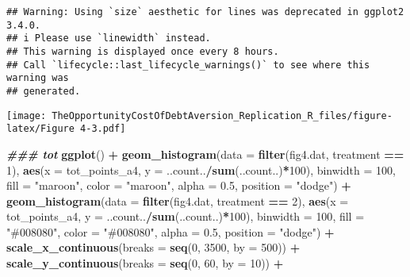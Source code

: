\documentclass[
]{article}
\newenvironment{Shaded}{\begin{snugshade}}{\end{snugshade}}
\newcommand{\AttributeTok}[1]{\textcolor[rgb]{0.13,0.29,0.53}{#1}}
\newcommand{\DecValTok}[1]{\textcolor[rgb]{0.00,0.00,0.81}{#1}}
\newcommand{\DocumentationTok}[1]{\textcolor[rgb]{0.56,0.35,0.01}{\textbf{\textit{#1}}}}
\newcommand{\FloatTok}[1]{\textcolor[rgb]{0.00,0.00,0.81}{#1}}
\newcommand{\FunctionTok}[1]{\textcolor[rgb]{0.13,0.29,0.53}{\textbf{#1}}}
\newcommand{\NormalTok}[1]{#1}
\newcommand{\SpecialCharTok}[1]{\textcolor[rgb]{0.81,0.36,0.00}{\textbf{#1}}}
\newcommand{\StringTok}[1]{\textcolor[rgb]{0.31,0.60,0.02}{#1}}
\begin{document}
\begin{verbatim}
## Warning: Using `size` aesthetic for lines was deprecated in ggplot2 3.4.0.
## i Please use `linewidth` instead.
## This warning is displayed once every 8 hours.
## Call `lifecycle::last_lifecycle_warnings()` to see where this warning was
## generated.
\end{verbatim}

\texttt{[image: TheOpportunityCostOfDebtAversion\_Replication\_R\_files/figure-latex/Figure 4-3.pdf]}

\begin{Shaded}
\begin{Highlighting}[]
\DocumentationTok{\#\#\# tot}
\FunctionTok{ggplot}\NormalTok{() }\SpecialCharTok{+}
  \FunctionTok{geom\_histogram}\NormalTok{(}\AttributeTok{data =} \FunctionTok{filter}\NormalTok{(fig4.dat, treatment }\SpecialCharTok{==} \DecValTok{1}\NormalTok{),}
                 \FunctionTok{aes}\NormalTok{(}\AttributeTok{x =}\NormalTok{ tot\_points\_a4, }\AttributeTok{y =}\NormalTok{ ..count..}\SpecialCharTok{/}\FunctionTok{sum}\NormalTok{(..count..)}\SpecialCharTok{*}\DecValTok{100}\NormalTok{),}
                 \AttributeTok{binwidth =} \DecValTok{100}\NormalTok{, }\AttributeTok{fill =} \StringTok{"maroon"}\NormalTok{, }\AttributeTok{color =} \StringTok{"maroon"}\NormalTok{, }\AttributeTok{alpha =} \FloatTok{0.5}\NormalTok{, }\AttributeTok{position =} \StringTok{"dodge"}\NormalTok{) }\SpecialCharTok{+}
  \FunctionTok{geom\_histogram}\NormalTok{(}\AttributeTok{data =} \FunctionTok{filter}\NormalTok{(fig4.dat, treatment }\SpecialCharTok{==} \DecValTok{2}\NormalTok{),}
                 \FunctionTok{aes}\NormalTok{(}\AttributeTok{x =}\NormalTok{ tot\_points\_a4, }\AttributeTok{y =}\NormalTok{ ..count..}\SpecialCharTok{/}\FunctionTok{sum}\NormalTok{(..count..)}\SpecialCharTok{*}\DecValTok{100}\NormalTok{),}
                 \AttributeTok{binwidth =} \DecValTok{100}\NormalTok{, }\AttributeTok{fill =} \StringTok{"\#008080"}\NormalTok{, }\AttributeTok{color =} \StringTok{"\#008080"}\NormalTok{, }\AttributeTok{alpha =} \FloatTok{0.5}\NormalTok{, }\AttributeTok{position =} \StringTok{"dodge"}\NormalTok{) }\SpecialCharTok{+}
  \FunctionTok{scale\_x\_continuous}\NormalTok{(}\AttributeTok{breaks =} \FunctionTok{seq}\NormalTok{(}\DecValTok{0}\NormalTok{, }\DecValTok{3500}\NormalTok{, }\AttributeTok{by =} \DecValTok{500}\NormalTok{)) }\SpecialCharTok{+}
  \FunctionTok{scale\_y\_continuous}\NormalTok{(}\AttributeTok{breaks =} \FunctionTok{seq}\NormalTok{(}\DecValTok{0}\NormalTok{, }\DecValTok{60}\NormalTok{, }\AttributeTok{by =} \DecValTok{10}\NormalTok{)) }\SpecialCharTok{+}

\end{Highlighting}
\end{Shaded}
\end{document}
